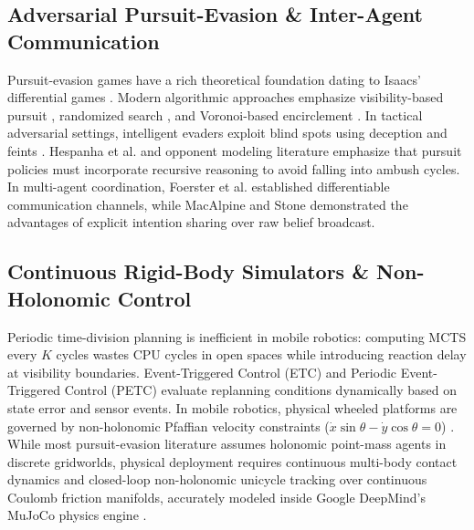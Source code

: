 \documentclass[conference]{IEEEtran}
\begin{document}
\subsection{Adversarial Pursuit-Evasion \& Inter-Agent Communication}
Pursuit-evasion games have a rich theoretical foundation dating to Isaacs' differential games \cite{isaacs1999differential, basar1999dynamic}. Modern algorithmic approaches emphasize visibility-based pursuit \cite{guibas1999visibility}, randomized search \cite{isler2005randomized}, and Voronoi-based encirclement \cite{pierson2017intercepting, zhou2016cooperative}. In tactical adversarial settings, intelligent evaders exploit blind spots using deception and feints \cite{aleksandrov2021pursuit}. Hespanha et al. \cite{hespanha1999probabilistic} and opponent modeling literature \cite{he2016opponent} emphasize that pursuit policies must incorporate recursive reasoning to avoid falling into ambush cycles. In multi-agent coordination, Foerster et al. \cite{foerster2016learning} established differentiable communication channels, while MacAlpine and Stone \cite{macalpine2018customized} demonstrated the advantages of explicit intention sharing over raw belief broadcast.

\subsection{Continuous Rigid-Body Simulators \& Non-Holonomic Control}
Periodic time-division planning is inefficient in mobile robotics: computing MCTS every $K$ cycles wastes CPU cycles in open spaces while introducing reaction delay at visibility boundaries. Event-Triggered Control (ETC) and Periodic Event-Triggered Control (PETC) \cite{tabuada2007event, heemels2012introduction} evaluate replanning conditions dynamically based on state error and sensor events. In mobile robotics, physical wheeled platforms are governed by non-holonomic Pfaffian velocity constraints ($\dot{x}\sin\theta - \dot{y}\cos\theta = 0$) \cite{kolmanovsky1995developments, laumond1998robot}. While most pursuit-evasion literature assumes holonomic point-mass agents in discrete gridworlds, physical deployment requires continuous multi-body contact dynamics and closed-loop non-holonomic unicycle tracking over continuous Coulomb friction manifolds, accurately modeled inside Google DeepMind's MuJoCo physics engine \cite{todorov2012mujoco}.

\end{document}
